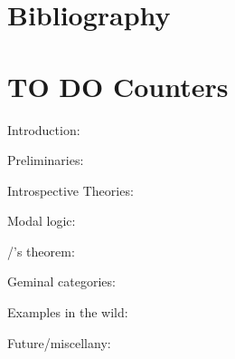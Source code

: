 \documentclass[12pt]{article}
\begin{document}


\newpage
\section{Bibliography}
\printbibliography

\printindex

{\color{red}
\section{TO DO Counters}
Introduction: \theIntroductionCounter

Preliminaries: \thePreliminariesCounter

Introspective Theories: \theIntrospectiveTheoryCounter

Modal logic: \theModalCounter

\Loeb/'s theorem: \theLoebCounter

Geminal categories: \theGLCategoryCounter

Examples in the wild: \theModelsCounter

Future/miscellany: \theNaiveSetTheoryCounter
}
\end{document}
